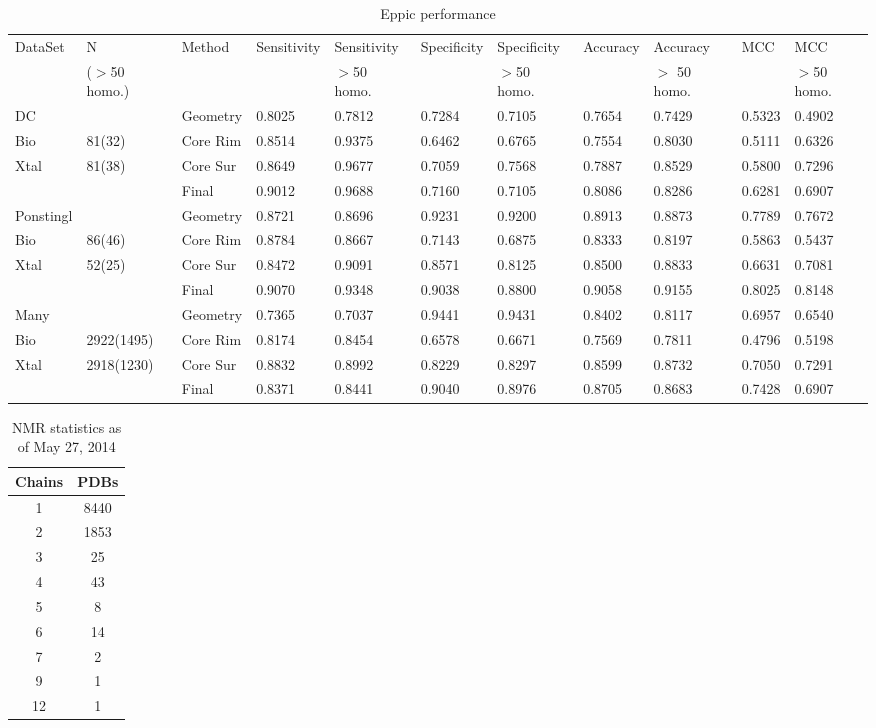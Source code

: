 
\begin{table}[h!]
	\caption{Eppic performance}
	\label{benchmark}
	\begin{scriptsize}
	\begin{tabular}{|l|l|l|l|l|l|l|l|l|l|l|}
	\hline
		DataSet & N & Method & Sensitivity & Sensitivity & Specificity & Specificity &  Accuracy & Accuracy & MCC & MCC\\
		 &($>$50 homo.)& & & $>$50 homo. & &  $>$50 homo.& & $>$ 50 homo. & &$>$50 homo. \\ \hline
		DC & & Geometry & 0.8025 & 0.7812 & 0.7284 & 0.7105 & 0.7654 & 0.7429 & 0.5323 & 0.4902 \\
		Bio& 81(32)&Core Rim & 0.8514 & 0.9375 & 0.6462 & 0.6765 & 0.7554 & 0.8030 & 0.5111 & 0.6326 \\
		Xtal& 81(38)&Core Sur & 0.8649 & 0.9677 & 0.7059 & 0.7568 & 0.7887 & 0.8529 & 0.5800 & 0.7296 \\
		& & Final & 0.9012 & 0.9688 & 0.7160 & 0.7105 & 0.8086 & 0.8286 & 0.6281 & 0.6907 \\ \hline
		Ponstingl & & Geometry & 0.8721 & 0.8696 & 0.9231 & 0.9200 & 0.8913 & 0.8873 & 0.7789 & 0.7672 \\
		Bio& 86(46)&Core Rim & 0.8784 & 0.8667 & 0.7143 & 0.6875 & 0.8333 & 0.8197 & 0.5863 & 0.5437 \\
		Xtal& 52(25)&Core Sur & 0.8472 & 0.9091 & 0.8571 & 0.8125 & 0.8500 & 0.8833 & 0.6631 & 0.7081 \\
		& & Final & 0.9070 & 0.9348 & 0.9038 & 0.8800 & 0.9058 & 0.9155 & 0.8025 & 0.8148 \\ \hline
		Many & & Geometry & 0.7365 & 0.7037 & 0.9441 & 0.9431 & 0.8402 & 0.8117 & 0.6957 & 0.6540 \\
		Bio& 2922(1495)&Core Rim & 0.8174 & 0.8454 & 0.6578 & 0.6671 & 0.7569 & 0.7811 & 0.4796 & 0.5198 \\
		Xtal& 2918(1230)&Core Sur & 0.8832 & 0.8992 & 0.8229 & 0.8297 & 0.8599 & 0.8732 & 0.7050 & 0.7291 \\
		& & Final & 0.8371 & 0.8441 & 0.9040 & 0.8976 & 0.8705 & 0.8683 & 0.7428 & 0.6907 \\ \hline

	\end{tabular}
	\end{scriptsize}
\end{table}

\begin{table}[h!]
\caption{NMR statistics as of May 27, 2014}
	\label{nmrtable}
		\begin{tabular}{|c|c|}
\hline
		 Chains &  PDBs \\ \hline 
		 1 & 8440 \\ 
		 2 & 1853 \\ 
		 3 & 25 \\ 
		 4 & 43 \\ 
		 5 & 8 \\ 
		 6 & 14 \\ 
		 7 & 2 \\ 
		 9 & 1 \\ 
		 12 & 1 \\ \hline
		\end{tabular}
\end{table}